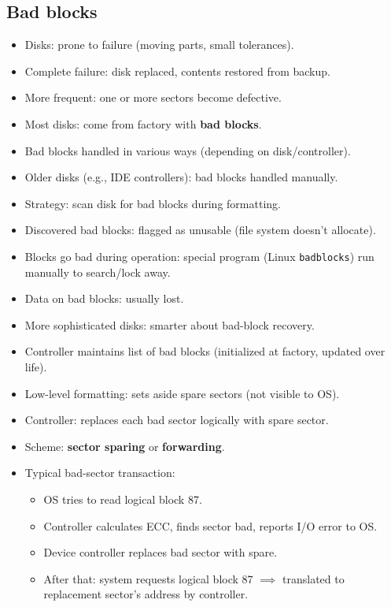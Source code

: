\subsection{Bad blocks}
\begin{itemize}
    \item Disks: prone to failure (moving parts, small tolerances).
    \item Complete failure: disk replaced, contents restored from backup.
    \item More frequent: one or more sectors become defective.
    \item Most disks: come from factory with \textbf{bad blocks}.
    \item Bad blocks handled in various ways (depending on disk/controller).
    \item Older disks (e.g., IDE controllers): bad blocks handled manually.
    \item Strategy: scan disk for bad blocks during formatting.
    \item Discovered bad blocks: flagged as unusable (file system doesn't allocate).
    \item Blocks go bad during operation: special program (Linux \texttt{badblocks}) run manually to search/lock away.
    \item Data on bad blocks: usually lost.
    \item More sophisticated disks: smarter about bad-block recovery.
    \item Controller maintains list of bad blocks (initialized at factory, updated over life).
    \item Low-level formatting: sets aside spare sectors (not visible to OS).
    \item Controller: replaces each bad sector logically with spare sector.
    \item Scheme: \textbf{sector sparing} or \textbf{forwarding}.
    \item Typical bad-sector transaction:
    \begin{itemize}
        \item OS tries to read logical block 87.
        \item Controller calculates ECC, finds sector bad, reports I/O error to OS.
        \item Device controller replaces bad sector with spare.
        \item After that: system requests logical block 87 $\implies$ translated to replacement sector's address by controller.
    \end{itemize}

\end{itemize}
